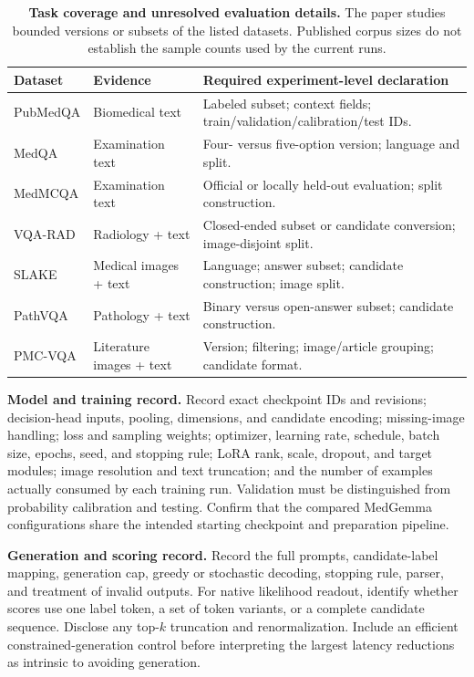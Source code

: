 \begin{table}[h]
\centering\small\renewcommand{\arraystretch}{1.2}
\caption{\textbf{Task coverage and unresolved evaluation details.} The paper studies bounded versions or subsets of the listed datasets. Published corpus sizes do not establish the sample counts used by the current runs.}
\begin{tabularx}{\linewidth}{@{}l l X@{}}
\toprule
\textbf{Dataset} & \textbf{Evidence} & \textbf{Required experiment-level declaration}\\
\midrule
PubMedQA & Biomedical text & Labeled subset; context fields; train/validation/calibration/test IDs.\\
MedQA & Examination text & Four- versus five-option version; language and split.\\
MedMCQA & Examination text & Official or locally held-out evaluation; split construction.\\
VQA-RAD & Radiology + text & Closed-ended subset or candidate conversion; image-disjoint split.\\
SLAKE & Medical images + text & Language; answer subset; candidate construction; image split.\\
PathVQA & Pathology + text & Binary versus open-answer subset; candidate construction.\\
PMC-VQA & Literature images + text & Version; filtering; image/article grouping; candidate format.\\
\bottomrule
\end{tabularx}
\end{table}

\textbf{Model and training record.} Record exact checkpoint IDs and revisions; decision-head inputs, pooling, dimensions, and candidate encoding; missing-image handling; loss and sampling weights; optimizer, learning rate, schedule, batch size, epochs, seed, and stopping rule; LoRA rank, scale, dropout, and target modules; image resolution and text truncation; and the number of examples actually consumed by each training run. Validation must be distinguished from probability calibration and testing. Confirm that the compared MedGemma configurations share the intended starting checkpoint and preparation pipeline.

\textbf{Generation and scoring record.} Record the full prompts, candidate-label mapping, generation cap, greedy or stochastic decoding, stopping rule, parser, and treatment of invalid outputs. For native likelihood readout, identify whether scores use one label token, a set of token variants, or a complete candidate sequence. Disclose any top-$k$ truncation and renormalization. Include an efficient constrained-generation control before interpreting the largest latency reductions as intrinsic to avoiding generation.

